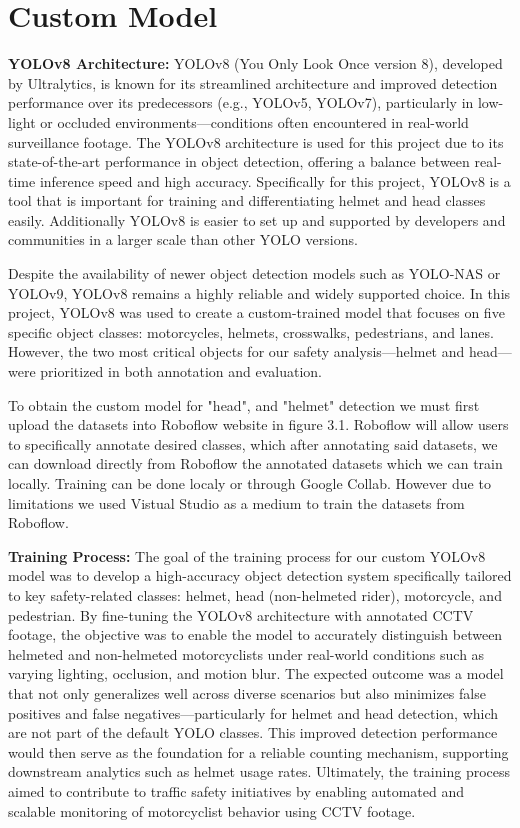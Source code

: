 \section{Custom Model}
\textbf{YOLOv8 Architecture:}
YOLOv8 (You Only Look Once version 8), developed by Ultralytics, is known for its streamlined architecture and improved detection performance over its predecessors (e.g., YOLOv5, YOLOv7), particularly in low-light or occluded environments—conditions often encountered in real-world surveillance footage. The YOLOv8 architecture is used for this project due to its state-of-the-art performance in object detection, offering a balance between real-time inference speed and high accuracy. Specifically for this project, YOLOv8 is a tool that is important for training and differentiating helmet and head classes easily. Additionally YOLOv8 is easier to set up and supported by developers and communities in a larger scale than other YOLO versions.

Despite the availability of newer object detection models such as YOLO-NAS or YOLOv9, YOLOv8 remains a highly reliable and widely supported choice. In this project, YOLOv8 was used to create a custom-trained model that focuses on five specific object classes: motorcycles, helmets, crosswalks, pedestrians, and lanes. However, the two most critical objects for our safety analysis—helmet and head—were prioritized in both annotation and evaluation.


To obtain the custom model for "head", and "helmet" detection we must first upload the datasets into Roboflow website in figure 3.1. Roboflow will allow users to specifically annotate desired classes, which after annotating said datasets, we can download directly from Roboflow the annotated datasets which we can train locally. Training can be done localy or through Google Collab. However due to limitations we used Vistual Studio as a medium to train the datasets from Roboflow. 

\newpage

\noindent\textbf{Training Process:} The goal of the training process for our custom YOLOv8 model was to develop a high-accuracy object detection system specifically tailored to key safety-related classes: helmet, head (non-helmeted rider), motorcycle, and pedestrian. By fine-tuning the YOLOv8 architecture with annotated CCTV footage, the objective was to enable the model to accurately distinguish between helmeted and non-helmeted motorcyclists under real-world conditions such as varying lighting, occlusion, and motion blur. The expected outcome was a model that not only generalizes well across diverse scenarios but also minimizes false positives and false negatives—particularly for helmet and head detection, which are not part of the default YOLO classes. This improved detection performance would then serve as the foundation for a reliable counting mechanism, supporting downstream analytics such as helmet usage rates. Ultimately, the training process aimed to contribute to traffic safety initiatives by enabling automated and scalable monitoring of motorcyclist behavior using CCTV footage.


